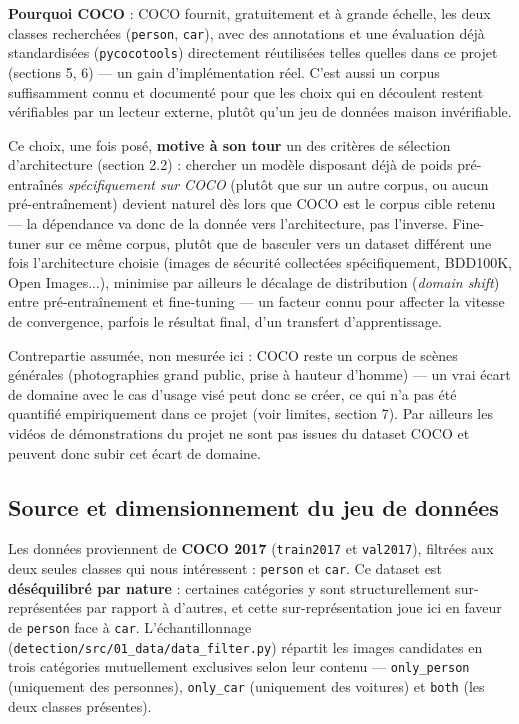\documentclass[11pt,a4paper]{article}
\let\Oldsubsection\subsection
\renewcommand{\subsection}{\FloatBarrier\Oldsubsection}
\begin{document}
    \textbf{Pourquoi COCO} : COCO fournit, gratuitement et à
    grande échelle, les deux classes recherchées (\texttt{person},
    \texttt{car}), avec des annotations et une évaluation déjà
    standardisées (\texttt{pycocotools}) directement réutilisées telles
    quelles dans ce projet (sections 5, 6) --- un gain d'implémentation réel. C'est aussi un corpus suffisamment connu et
    documenté pour que les choix qui en découlent restent vérifiables par
    un lecteur externe, plutôt qu'un jeu de données maison invérifiable.
    
    Ce choix, une fois posé, \textbf{motive à son tour} un des critères de
    sélection d'architecture (section 2.2) : chercher un modèle disposant
    déjà de poids pré-entraînés \emph{spécifiquement sur COCO} (plutôt que
    sur un autre corpus, ou aucun pré-entraînement) devient naturel dès
    lors que COCO est le corpus cible retenu --- la dépendance va donc de
    la donnée vers l'architecture, pas l'inverse. Fine-tuner sur ce même
    corpus, plutôt que de basculer vers un dataset différent une fois
    l'architecture choisie (images de sécurité collectées spécifiquement,
    BDD100K, Open Images...), minimise par ailleurs le décalage de
    distribution (\emph{domain shift}) entre pré-entraînement et
    fine-tuning --- un facteur connu pour affecter la vitesse de
    convergence, parfois le résultat final, d'un transfert d'apprentissage.
    
    Contrepartie assumée, non mesurée ici : COCO reste un corpus de scènes
    générales (photographies grand public, prise à hauteur d'homme) --- un vrai écart de domaine avec le cas d'usage visé peut donc se créer, ce qui n'a pas été quantifié empiriquement dans ce projet
    (voir limites, section 7). Par ailleurs les vidéos de démonstrations du projet ne sont pas issues du dataset COCO et peuvent donc subir cet écart de domaine.
    
    \subsection{Source et dimensionnement du jeu de données}
    \label{sec:dimensionnement-dataset}
    
    Les données proviennent de \textbf{COCO 2017} (\texttt{train2017} et
    \texttt{val2017}), filtrées aux deux seules classes qui nous
    intéressent : \texttt{person} et \texttt{car}. Ce dataset est
    \textbf{déséquilibré par nature} : certaines catégories y sont
    structurellement sur-représentées par rapport à d'autres, et cette
    sur-représentation joue ici en faveur de \texttt{person} face à
    \texttt{car}. L'échantillonnage (\texttt{detection/src/01\_data/data\_filter.py})
    répartit les images candidates en trois catégories mutuellement
    exclusives selon leur contenu --- \texttt{only\_person} (uniquement
    des personnes), \texttt{only\_car} (uniquement des voitures) et
    \texttt{both} (les deux classes présentes).
    
\end{document}

